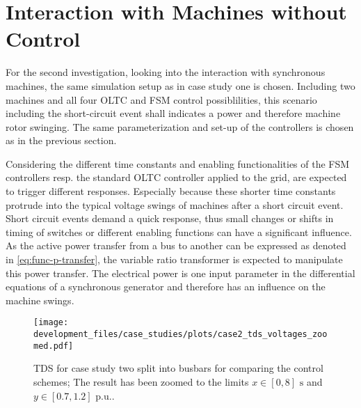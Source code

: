 \section{Interaction with Machines without Control}
\label{sec:case-2}

For the second investigation, looking into the interaction with synchronous machines, the same simulation setup as in case study one is chosen.
Including two machines and all four \acs{OLTC} and \acs{FSM} control possiblilities, this scenario including the short-circuit event shall indicates a power and therefore machine rotor swinging.
The same parameterization and set-up of the controllers is chosen as in the previous section.

Considering the different time constants and enabling functionalities of the \acs{FSM} controllers resp. the standard \acs{OLTC} controller applied to the grid, are expected to trigger different responses.
Especially because these shorter time constants protrude into the typical voltage swings of machines after a short circuit event.
Short circuit events demand a quick response, thus small changes or shifts in timing of switches or different enabling functions can have a significant influence.
As the active power transfer from a bus to another can be expressed as denoted in \autoref{eq:func-p-transfer}, the variable ratio transformer is expected to manipulate this power transfer.
The electrical power is one input parameter in the differential equations of a synchronous generator \autocite{machowski_2020,kundur_2022} and therefore has an influence on the machine swings.

\begin{figure}[htb!]
    \centering
    \texttt{[image: development\_files/case\_studies/plots/case2\_tds\_voltages\_zoomed.pdf]}
    \caption[\acs{TDS} for case study two split into busbars for comparing the control schemes]{\acs{TDS} for case study two split into busbars for comparing the control schemes; The result has been zoomed to the limits $x \in [0,8]\text{ s}$ and $y \in [0.7,1.2]\text{ p.u.}$.}
    \label{fig:case2-voltages}
\end{figure}

